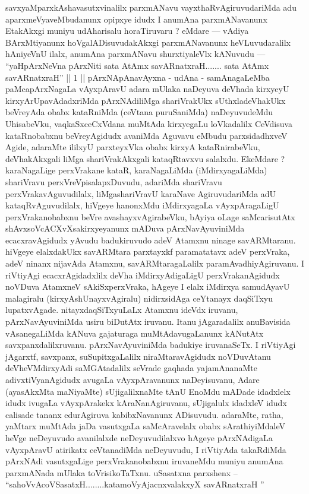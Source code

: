 \begin{artha}
savxyaMparxkAshavasutxvinalilx parxmANavu vayxthaRvAgiruvudariMda adu aparxmeVya\-veMbudanunx opipxye idudx I anumAna parxmANavanunx EtakAkxgi muniyu udA\-harisalu horaTiruvaru ? eMdare --- vAdiya BArxMtiyanunx hoVgalADisu\-vudakAkxgi parxmANavanunx heVLuvudaralilx hAniyeVnU ilalx, anumAna parxmANavu shurxtiyaleVlx kANuvudu --- ``yaHpArxNeVna pArxNiti sata AtAmx savARnatxraH....... sata AtAmx savARnatxraH'' || 1 || pArxNApAnavAyxna - udAna - samAnagaLeMba paMcapArxNagaLa vAyxpAravU adara mUlaka naDeyuva deVhada kirxyeyU kirxyA\-rUpavAdadxriMda pArxNAdiliMga shariVrakUkx sUthxladeVhakUkx beVreyAda obabx kataR\-niMda (ceVtana puruSaniMda) naDeyuvudeMdu UhisabeVku, vaqkaSxceCxVdana \-muMtAda kirxyegaLu loVkadalilx CeVdisuva kataRnobabxnu beVreyAgidudx avaniMda Aguvavu eMbudu parxsidadhxveV Agide, adaraMte ililxyU parxteyxVka obabx kirxyA kataRnirabeVku, deVhakAkxgali liMga shariVrakAkxgali kataqRtavxvu salalxdu. EkeMdare ? karaNagaLige perxVrakane kataR, karaNagaLiMda (iMdirxyagaLiMda) shariVravu perxVreVpisalapxDuvudu, adariMda shariVravu perxVrakavAguvudilalx, liMgashariVravU karaNave AgiruvudariMda adU kataqRvAguvudilalx, hiVgeye hanonxMdu iMdirxyagaLa vAyxpAragaLigU perxVraka\-nobabxnu beVre avashayxvAgirabeVku, bAyiya oLage saMcarisutAtx shAvxsoVcACXvXsakirxye\-yanunx mADuva pArxNavAyuviniMda ecacxravAgidudx yAvudu badukiruvudo adeV Atamxnu ninage savARMtaranu. hiVgeye elalxdakUkx savARMtara parxtayxkf paramatatavx adeV perxVraka, adeV ninanx nijavAda Atamxnu, savARMtaragaLalilx paramAvadhiyAgi\-ruvanu. I riVtiyAgi ecacxrAgidadxlilx deVha iMdirxyAdigaLigU perxVrakanAgidudx noVDuva AtamxneV sAkiSxperxVraka, hAgeye I elalx iMdirxya samudAyavU malagi\-ralu (kirxyAshUnayxvAgiralu) nidirxsidAga ceYtanayx daqSiTxyu lupatxvAgade. nitayxdaqSiTx\-yuLaLx Atamxnu ideVdx iruvanu, pArxNavAyuviniMda usiru biDutAtx iruvanu. Itanu jAgaradalilx anuBavisida vAsanegaLiMda kANuva gajaturaga muMtAdavu\-gaLanunx kANutAtx savxpanxdalilxruvanu. pArxNavAyuviniMda badukiye iruvanaSeTx. I riVtiyAgi jAgarxtf, savxpanx, suSupitxgaLalilx niraMtaravAgidudx noVDuvAtanu \-deVheVMdirxyAdi saMGAtadalilx seVrade gaqhada yajamAnanaMte adivxtiVyanAgidudx avugaLa vAyxpAravanunx naDeyisuvanu, Adare (ayasAkxMta maNiyaMte) sUji\-galilxnaMte tAnU EnoMdu mADade idadxlelx idudx ivugaLa vAyxpArakekx kAraNa\-nAgiruvanu, sUjigalulx idadxleV idudx calisade tananx edurAgiruva kabibxNavanunx ADisuvudu. adaraMte, ratha, yaMtarx muMtAda jaDa vasutxgaLa saMcAravelalx \-obabx sArathiyiMdaleV heVge neDeyuvudo avanilalxde neDeyuvudilalxvo hAgeye pArxNAdigaLa vAyxpAravU atirikatx ceVtanadiMda neDeyuvudu, I riVtiyAda takaR\-diMda pArxNAdi vasutxgaLige perxVrakanobabxnu iruvaneMdu muniyu anumAna \-parxmANada mUlaka toVrisikoTaTxnu. uSasatxna parxshenx -- ``sahoVvAcoVSasatxH..\-......katamoVyAjacnxvalakxyX savARnatxraH ''
\end{artha}

